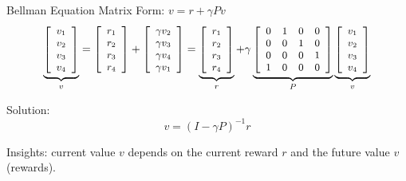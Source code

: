 \begin{frame}

    Bellman Equation Matrix Form: $v = r + \gamma Pv$
    $$
    \small
    \underbrace{\left[\begin{array}{l}
    v_{1} \\
    v_{2} \\
    v_{3} \\
    v_{4}
    \end{array}\right]}_{v} = 
    \left[\begin{array}{l}
    r_{1} \\
    r_{2} \\
    r_{3} \\
    r_{4}
    \end{array}\right] + 
    \left[\begin{array}{l}
    \gamma v_{2} \\
    \gamma v_{3} \\
    \gamma v_{4} \\
    \gamma v_{1}
    \end{array}\right] = 
    \underbrace{\left[\begin{array}{l}
    r_{1} \\
    r_{2} \\
    r_{3} \\
    r_{4}
    \end{array}\right]}_{r} + 
    \gamma \underbrace{\left[\begin{array}{llll}
    0 & 1 & 0 & 0 \\
    0 & 0 & 1 & 0 \\
    0 & 0 & 0 & 1 \\
    1 & 0 & 0 & 0
    \end{array}\right]}_{P} 
    \underbrace{\left[\begin{array}{l}
    v_{1} \\
    v_{2} \\
    v_{3} \\
    v_{4}
    \end{array}\right]}_{v}
    $$

    Solution:
    $$
    v = (I - \gamma P)^{-1} r
    $$

    Insights: current value $v$ depends on the current reward $r$ and 
    the future value $v$ (rewards).
\end{frame}



